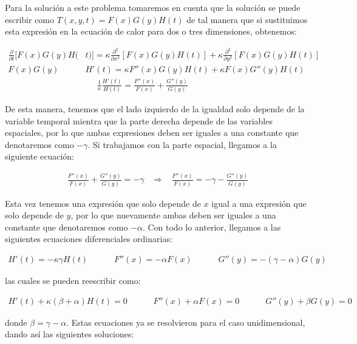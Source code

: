 \documentclass[12pt]{article}
\begin{document}
Para la solución a este problema tomaremos en cuenta que la solución se puede escribir como $T(x,y,t) = F(x)G(y)H(t)$ de tal manera que si sustituimos esta expresión en la ecuación de calor para dos o tres dimensiones, obtenemos:

\begin{align*}
    \frac{\partial}{\partial t}[F(x)G(y)H(&t)] = \kappa\frac{\partial^2}{\partial x^2}[F(x)G(y)H(t)] + \kappa\frac{\partial^2}{\partial y^2}[F(x)G(y)H(t)] \\
    F(x)G(y)&H'(t) = \kappa F''(x)G(y)H(t) + \kappa F(x)G''(y)H(t) \\
    &\;\;\;\;\;\frac{1}{\kappa}\frac{H'(t)}{H(t)} = \frac{F''(x)}{F(x)} + \frac{G''(y)}{G(y)}
\end{align*}

De esta manera, tenemos que el lado izquierdo de la igualdad solo depende de la variable temporal mientra que la parte derecha depende de las variables espaciales, por lo que ambas expresiones deben ser iguales a una constante que denotaremos como $-\gamma$. Si trabajamos con la parte espacial, llegamos a la siguiente ecuación:

\begin{align*}
    \frac{F''(x)}{F(x)} + \frac{G''(y)}{G(y)} = -\gamma \;\;\; \Rightarrow \;\;\; \frac{F''(x)}{F(x)} = -\gamma - \frac{G''(y)}{G(y)}
\end{align*}

Esta vez tenemos una expresión que solo depende de $x$ igual a una expresión que solo depende de $y$, por lo que nuevamente ambas deben ser iguales a una constante que denotaremos como $-\alpha$. Con todo lo anterior, llegamos a las siguientes ecuaciones diferenciales ordinarias:

\begin{align*}
    H'(t) = -\kappa\gamma H(t) \;\;\;\;\;\;\;\;\;\;\; F''(x) = -\alpha F(x) \;\;\;\;\;\;\;\;\;\;\; G''(y) = -(\gamma-\alpha) G(y)
\end{align*}

las cuales se pueden reescribir como:

\begin{align*}
    H'(t) + \kappa(\beta + \alpha) H(t)=0 \;\;\;\;\;\;\;\;\;\;\; F''(x) + \alpha F(x)=0 \;\;\;\;\;\;\;\;\;\;\; G''(y) + \beta G(y) = 0
\end{align*}

donde $\beta = \gamma-\alpha$. Estas ecuaciones ya se resolvieron para el caso unidimensional, dando así las siguientes soluciones:
\end{document}
